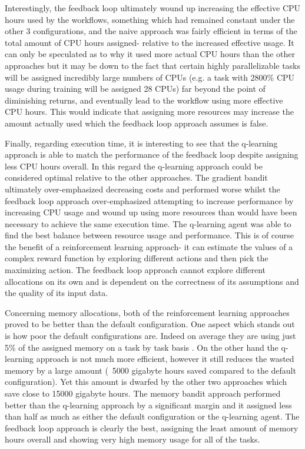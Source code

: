 Interestingly, the feedback loop ultimately wound up increasing the effective CPU hours used by the workflows, something which had remained constant under the other 3 configurations, and the naive approach was fairly efficient in terms of the total amount of CPU hours assigned- relative to the increased effective usage. It can only be speculated as to why it used more actual CPU hours than the other approaches but it may be down to the fact that certain highly parallelizable tasks will be assigned incredibly large numbers of CPUs (e.g. a task with 2800\% CPU usage during training will be assigned 28 CPUs) far beyond the point of diminishing returns, and eventually lead to the workflow using more effective CPU hours. This would indicate that assigning more resources may increase the amount actually used which the feedback loop approach assumes is false.

Finally, regarding execution time, it is interesting to see that the q-learning approach is able to match the performance of the feedback loop despite assigning less CPU hours overall. In this regard the q-learning approach could be considered optimal relative to the other approaches. The gradient bandit ultimately over-emphasized decreasing costs and performed worse whilst the feedback loop approach over-emphasized attempting to increase performance by increasing CPU usage and wound up using more resources than would have been necessary to achieve the same execution time. The q-learning agent was able to find the best balance between resource usage and performance. This is of course the benefit of a reinforcement learning approach- it can estimate the values of a complex reward function by exploring different actions and then pick the maximizing action. The feedback loop approach cannot explore different allocations on its own and is dependent on the correctness of its assumptions and the quality of its input data.

Concerning memory allocations, both of the reinforcement learning approaches proved to be better than the default configuration. One aspect which stands out is how poor the default configurations are. Indeed on average they are using just 5\% of the assigned memory on a task by task basis . On the other hand the q-learning approach is not much more efficient, however it still reduces the wasted memory by a large amount (~5000 gigabyte hours saved compared to the default configuration). Yet this amount is dwarfed by the other two approaches which save close to 15000 gigabyte hours. The memory bandit approach performed better than the q-learning approach by a significant margin and it assigned less than half as much as either the default configuration or the q-learning agent. The feedback loop approach is clearly the best, assigning the least amount of memory hours overall and showing very high memory usage for all of the tasks.

